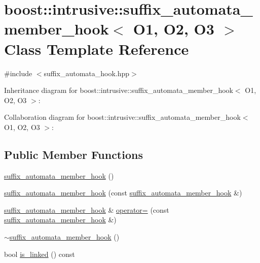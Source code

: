 \hypertarget{classboost_1_1intrusive_1_1suffix__automata__member__hook}{}\section{boost\+:\+:intrusive\+:\+:suffix\+\_\+automata\+\_\+member\+\_\+hook$<$ O1, O2, O3 $>$ Class Template Reference}
\label{classboost_1_1intrusive_1_1suffix__automata__member__hook}


{\ttfamily \#include $<$suffix\+\_\+automata\+\_\+hook.\+hpp$>$}



Inheritance diagram for boost\+:\+:intrusive\+:\+:suffix\+\_\+automata\+\_\+member\+\_\+hook$<$ O1, O2, O3 $>$\+:


Collaboration diagram for boost\+:\+:intrusive\+:\+:suffix\+\_\+automata\+\_\+member\+\_\+hook$<$ O1, O2, O3 $>$\+:
\subsection*{Public Member Functions}
\begin{DoxyCompactItemize}
\item 
\hyperlink{classboost_1_1intrusive_1_1suffix__automata__member__hook_aca54034dcd2a776ee7848f2dc7217e3d}{suffix\+\_\+automata\+\_\+member\+\_\+hook} ()
\item 
\hyperlink{classboost_1_1intrusive_1_1suffix__automata__member__hook_a0a84697877c77bf866616e4a97884800}{suffix\+\_\+automata\+\_\+member\+\_\+hook} (const \hyperlink{classboost_1_1intrusive_1_1suffix__automata__member__hook}{suffix\+\_\+automata\+\_\+member\+\_\+hook} \&)
\item 
\hyperlink{classboost_1_1intrusive_1_1suffix__automata__member__hook}{suffix\+\_\+automata\+\_\+member\+\_\+hook} \& \hyperlink{classboost_1_1intrusive_1_1suffix__automata__member__hook_a744f716be03e65c94b913d46f96e59e1}{operator=} (const \hyperlink{classboost_1_1intrusive_1_1suffix__automata__member__hook}{suffix\+\_\+automata\+\_\+member\+\_\+hook} \&)
\item 
\hyperlink{classboost_1_1intrusive_1_1suffix__automata__member__hook_ab81bbc4d673eb8696c87af2fbd6063ff}{$\sim$suffix\+\_\+automata\+\_\+member\+\_\+hook} ()
\item 
bool \hyperlink{classboost_1_1intrusive_1_1suffix__automata__member__hook_a785349f14feccd5bc2b775814914a262}{is\+\_\+linked} () const
\end{DoxyCompactItemize}


